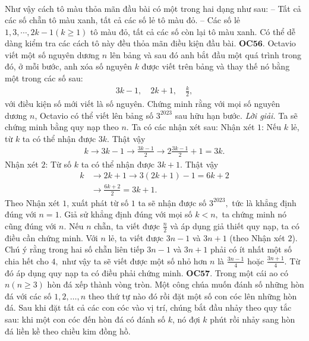 \begin{multicols}{2}
\begin{align*}
	\end{align*}
	Như vậy cách tô màu thỏa mãn đầu bài có một trong hai dạng như sau:
	\vskip 0.1cm
	-- Tất cả các số chẵn tô màu xanh, tất cả các số lẻ tô màu đỏ.
	\vskip 0.1cm
	-- Các số lẻ $1, 3, \cdots, 2k-1 (k\ge 1)$ tô màu đỏ, tất cả các số còn lại tô màu xanh. 
	\vskip 0.1cm
	Có thể dễ dàng kiểm tra các cách tô này đều thỏa mãn điều kiện đầu bài.
	\vskip 0.1cm
	{\bf\color{cackithi} OC$\pmb{56.}$} Octavio viết một số nguyên dương $n$ lên bảng  và sau đó anh bắt đầu một quá trình trong đó, ở mỗi bước, anh xóa số nguyên $k$ được viết trên bảng  và thay thế nó bằng một trong các số sau:
	\begin{align*}
		3k-1, \quad 2k+1, \quad \frac{k}{2},
	\end{align*} 
	với điều kiện số mới viết là số nguyên.
	\vskip 0.1cm
	Chứng minh rằng với mọi số nguyên dương $n$, Octavio có thể viết lên bảng  số $3^{2023}$ sau hữu hạn bước.
	\vskip 0.1cm
	\textit{Lời giải.} Ta sẽ chứng minh bằng quy nạp theo $n.$ Ta có các nhận xét sau:
	\vskip 0.1cm
	Nhận xét $1$: Nếu $k$ lẻ, từ $k$ ta có thể nhận được $3k.$  Thật vậy 
	\begin{align*}
		 k\rightarrow 3k-1 \rightarrow \frac{3k-1}{2} \rightarrow 2\frac{3k-1}{2} +1=3k.
	\end{align*}
	Nhận xét $2$: Từ số $k$ ta có thể nhận được $3k+1.$  Thật vậy 
	\begin{align*}
		k&\rightarrow 2k+1 \rightarrow 3(2k+1)-1=6k+2 \\
		&\rightarrow \frac{6k+2}{2}=3k+1.
	\end{align*}
	Theo Nhận xét $1$, xuất phát từ số $1$ ta sẽ nhận được số $3^{2023},$ tức là khẳng định đúng với $n=1.$ Giả sử khẳng định đúng với mọi số $k< n,$ ta chứng minh nó cũng đúng với $n.$ 
	\vskip 0.1cm
	Nếu $n$ chẵn, ta viết được $\frac{n}{2}$ và áp dụng giả thiết quy nạp, ta có điều cần chứng minh. Với $n$ lẻ, ta viết được $3n-1$ và $3n+1$ (theo Nhận xét $2$). Chú ý rằng trong hai số chẵn liên tiếp  $3n-1$ và $3n+1$ phải có ít nhất một số chia hết cho $4,$ như vậy ta sẽ viết được một số nhỏ hơn $n$ là $\frac{3n-1}{4}$ hoặc $\frac{3n+1}{4}.$ Từ đó áp dụng quy nạp ta có điều phải chứng minh.
	\vskip 0.1cm
	{\bf\color{cackithi} OC$\pmb{57.}$} Trong một cái ao có $n (n \geq 3)$  hòn đá  xếp thành vòng tròn. Một công chúa muốn đánh số những hòn đá với các số $1, 2, \dots, n$ theo thứ tự nào đó rồi đặt một số con cóc lên những hòn đá. Sau khi đặt tất cả các con cóc vào vị trí, chúng bắt đầu nhảy theo quy tắc sau: khi một con cóc đến hòn đá có đánh số $k$, nó đợi $k$ phút rồi nhảy sang hòn đá liền kề theo chiều kim đồng hồ.

\end{multicols}
